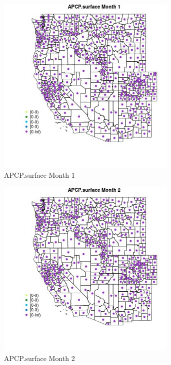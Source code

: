 \begin{figure} 
\centering  
\includegraphics[width=0.77\textwidth]{Code_Outputs/df_report_ML_predictors_CountyCentroid_Locations_Dates_2008-01-01to2018-12-31_MapObsMo1APCPsurface.jpg} 
\caption{\label{fig:df_report_ML_predictors_CountyCentroid_Locations_Dates_2008-01-01to2018-12-31MapObsMo1APCPsurface}APCP.surface Month 1} 
\end{figure} 
 

\begin{figure} 
\centering  
\includegraphics[width=0.77\textwidth]{Code_Outputs/df_report_ML_predictors_CountyCentroid_Locations_Dates_2008-01-01to2018-12-31_MapObsMo2APCPsurface.jpg} 
\caption{\label{fig:df_report_ML_predictors_CountyCentroid_Locations_Dates_2008-01-01to2018-12-31MapObsMo2APCPsurface}APCP.surface Month 2} 
\end{figure} 
 

